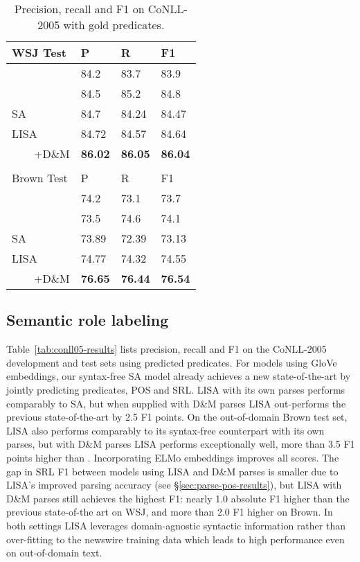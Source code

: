 \documentclass[11pt,a4paper]{article}
\begin{document}
\begin{table}
\begin{tabular}{llll}
WSJ Test & P & R & F1 \\ \hline \hline
\citet{he2018jointly} & 84.2 & 83.7 & 83.9 \\
\citet{tan2018deep} & 84.5 & 85.2 & 84.8 \\ \hline
SA & 84.7 & 84.24 & 84.47 \\
LISA & 84.72 &	84.57	& 84.64 \\ \ \ \ \ +D\&M & {\bf 86.02} &	{\bf 86.05} &	{\bf 86.04}  \\
& & & \\
Brown Test &  P & R & F1 \\ \hline \hline
\citet{he2018jointly} & 74.2 & 73.1 & 73.7 \\
\citet{tan2018deep} & 73.5 & 74.6 & 74.1 \\ \hline
SA & 73.89 & 72.39 & 73.13 \\
LISA & 74.77 & 74.32 &	74.55 \\ \ \ \ \ +D\&M & {\bf 76.65} & {\bf 76.44} & {\bf 76.54} \\ \end{tabular}
\caption{Precision, recall and F1 on CoNLL-2005 with gold predicates. \label{tab:conll05-gold-pred}}
\end{table}

\subsection{Semantic role labeling \label{sec:conll05}}

Table~\ref{tab:conll05-results} lists precision, recall and F1 on the CoNLL-2005 development and test sets using predicted predicates. For models using GloVe embeddings, our syntax-free SA model already achieves a new state-of-the-art by jointly predicting predicates, POS and SRL. LISA with its own parses performs comparably to SA, but when supplied with D\&M parses LISA out-performs the previous state-of-the-art by 2.5 F1 points. On the out-of-domain Brown test set, LISA also performs comparably to its syntax-free counterpart with its own parses, but with D\&M parses LISA performs exceptionally well, more than 3.5 F1 points higher than \citet{he2018jointly}. Incorporating ELMo embeddings improves all scores. The gap in SRL F1 between models using LISA and D\&M parses is smaller due to LISA's improved parsing accuracy (see \S\ref{sec:parse-pos-results}), but LISA with D\&M parses still achieves the highest F1: nearly 1.0 absolute F1 higher than the previous state-of-the art on WSJ, and more than 2.0 F1 higher on Brown. In both settings LISA leverages domain-agnostic syntactic information rather than over-fitting to the newswire training data which leads to high performance even on out-of-domain text.
\end{document}

